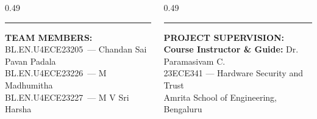 \documentclass[aspectratio=169,11pt]{beamer}
\newcommand{\memberOneRoll}{BL.EN.U4ECE23205}
\newcommand{\memberOneName}{Chandan Sai Pavan Padala}
\newcommand{\memberTwoRoll}{BL.EN.U4ECE23226}
\newcommand{\memberTwoName}{M Madhumitha}
\newcommand{\memberThreeRoll}{BL.EN.U4ECE23227}
\newcommand{\memberThreeName}{M V Sri Harsha}
\newcommand{\guideName}{Dr. Paramasivam C.}
\begin{document}
\begin{frame}[t]
  \vspace{0.06cm}
  \begin{columns}[T]
    \begin{column}{0.49\textwidth}
      \begin{glasscard}[top=3.5pt, bottom=3.5pt, left=6pt, right=6pt]
        {\color{accentDark}\rule[-1pt]{2.5pt}{9pt}}\hspace{5pt}%
        {\fontsize{9.5pt}{11.5pt}\selectfont\bfseries\color{textPrimary} TEAM MEMBERS:}\\[2.5pt]
        {\fontsize{8.5pt}{11.0pt}\selectfont\color{textPrimary}
        \memberOneRoll\ --- \memberOneName\\
        \memberTwoRoll\ --- \memberTwoName\\
        \memberThreeRoll\ --- \memberThreeName}
      \end{glasscard}
    \end{column}
    \begin{column}{0.49\textwidth}
      \begin{glasscard}[top=3.5pt, bottom=3.5pt, left=6pt, right=6pt]
        {\color{accentDark}\rule[-1pt]{2.5pt}{9pt}}\hspace{5pt}%
        {\fontsize{9.5pt}{11.5pt}\selectfont\bfseries\color{textPrimary} PROJECT SUPERVISION:}\\[2.5pt]
        {\fontsize{8.5pt}{11.0pt}\selectfont\color{textPrimary}
        \textbf{\color{textPrimary}Course Instructor \& Guide:}\hspace{0.5em} \color{textPrimary}\guideName\\
        {\fontsize{7.8pt}{9.8pt}\selectfont\color{black!70} 23ECE341 --- Hardware Security and Trust}\\[1.5pt]
        {\fontsize{7.8pt}{9.8pt}\selectfont\color{black!70} Amrita School of Engineering, Bengaluru}}
      \end{glasscard}
    \end{column}
  \end{columns}
\end{frame}
\end{document}
